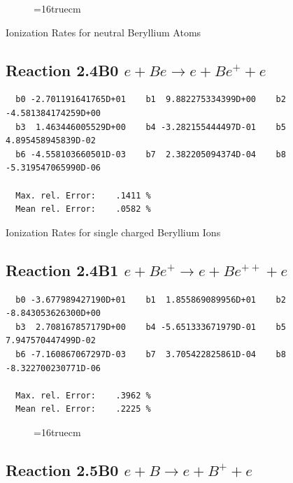 \documentclass[12pt,dvips]{article}
\begin{document}
\begin{figure} \label{2.2B}
\epsfxsize=16truecm
\end{figure}
\newpage

 Ionization Rates for neutral Beryllium Atoms

\subsection{
Reaction 2.4B0   $e + Be \rightarrow e + Be^+ + e $
}

\begin{small}\begin{verbatim}
  b0 -2.701191641765D+01    b1  9.882275334399D+00    b2 -4.581384174259D+00
  b3  1.463446005529D+00    b4 -3.282155444497D-01    b5  4.895458945839D-02
  b6 -4.558103660501D-03    b7  2.382205094374D-04    b8 -5.319547065990D-06

  Max. rel. Error:    .1411 %
  Mean rel. Error:    .0582 %

\end{verbatim}\end{small}

 Ionization Rates for
 single charged Beryllium Ions

\subsection{
Reaction 2.4B1  $e + Be^+ \rightarrow e + Be^{++} + e $
}


\begin{small}\begin{verbatim}
  b0 -3.677989427190D+01    b1  1.855869089956D+01    b2 -8.843053626300D+00
  b3  2.708167857179D+00    b4 -5.651333671979D-01    b5  7.947570447499D-02
  b6 -7.160867067297D-03    b7  3.705422825861D-04    b8 -8.322700230771D-06

  Max. rel. Error:    .3962 %
  Mean rel. Error:    .2225 %

\end{verbatim}\end{small}

\begin{figure} \label{2.4B}
\epsfxsize=16truecm
\end{figure}
\newpage

\subsection{
Reaction 2.5B0   $e + B \rightarrow e + B^+ + e $
}
\end{document}
